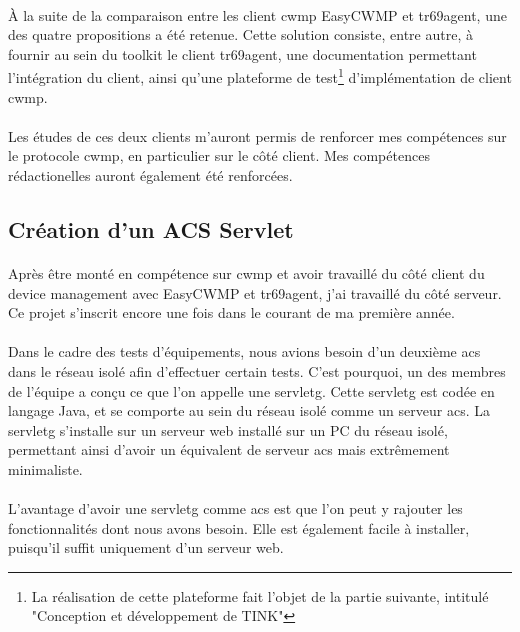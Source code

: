 \documentclass[12pt,a4paper]{report}
\begin{document}
\paragraph*{}À la suite de la comparaison entre les client \gls{cwmp} EasyCWMP et tr69agent, une des quatre propositions a été retenue. Cette solution consiste, entre autre, à fournir au sein du toolkit le client tr69agent, une documentation permettant l'intégration du client, ainsi qu'une plateforme de test\footnote{La réalisation de cette plateforme fait l'objet de la partie suivante, intitulé "Conception et développement de TINK"} d'implémentation de client \gls{cwmp}. 
\paragraph*{}Les études de ces deux clients m'auront permis de renforcer mes compétences sur le protocole \gls{cwmp}, en particulier sur le côté client. Mes compétences rédactionelles auront également été renforcées. \\
\subsection{Création d'un ACS Servlet}
\paragraph*{}Après être monté en compétence sur \gls{cwmp} et avoir travaillé du côté client du device management avec EasyCWMP et tr69agent, j’ai travaillé du côté serveur. Ce projet s'inscrit encore une fois dans le courant de ma première année.
\paragraph*{}Dans le cadre des tests d'équipements, nous avions besoin d’un deuxième \gls{acs} dans le réseau isolé afin d’effectuer certain tests. C’est pourquoi, un des membres de l’équipe a conçu ce que l’on appelle une \gls{servletg}. Cette \gls{servletg} est codée en langage Java, et se comporte au sein du réseau isolé comme un serveur \gls{acs}. La \gls{servletg} s’installe sur un serveur web installé sur un PC du réseau isolé, permettant ainsi d’avoir un équivalent de serveur \gls{acs} mais extrêmement minimaliste.
\paragraph*{}L’avantage d’avoir une \gls{servletg} comme \gls{acs} est que l’on peut y rajouter les fonctionnalités dont nous avons besoin. Elle est également facile à installer, puisqu’il suffit uniquement d’un serveur web.
\end{document}
